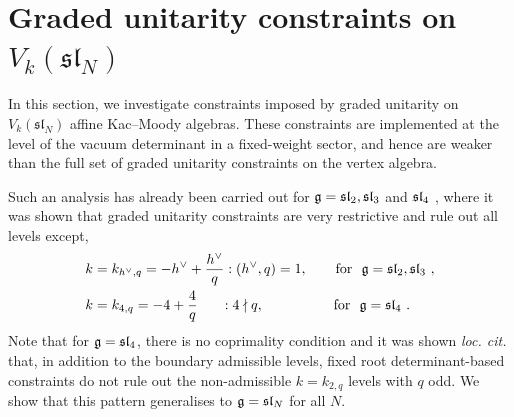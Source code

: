 \section{Graded unitarity constraints on $V_k(\mathfrak{sl}_N)$} \label{sec:typeAgrunit}
In this section, we investigate constraints imposed by graded unitarity on $V_k(\mathfrak{sl}_N)$ affine Kac--Moody algebras. These constraints are implemented at the level of the vacuum determinant in a fixed-weight sector, and hence are weaker than the full set of graded unitarity constraints on the vertex algebra. 

Such an analysis has already been carried out for $\mathfrak{g} = \mathfrak{sl}_2, \mathfrak{sl}_3$ and $\mathfrak{sl}_4$ \cite{ArabiArdehali:2025fad}, where it was shown that graded unitarity constraints are very restrictive and rule out all levels except,
\begin{equation}
\begin{split}
    &k = k_{h^\vee,q} = -h^\vee + \frac{h^\vee}{q}: (h^\vee,q) = 1, \qquad \mathrm{for} \ \ \mathfrak{g} = \mathfrak{sl}_2, \mathfrak{sl}_3~, \\
    &k = k_{4,q} = -4 + \frac{4}{q} \ \ \ \ \ :4 \nmid q, \qquad \qquad \ \ \ \mathrm{for} \ \ \mathfrak{g} = \mathfrak{sl}_4~.
\end{split}
\end{equation}
Note that for $\mathfrak{g} = \mathfrak{sl}_4$, there is no coprimality condition and it was shown \emph{loc. cit.} that, in addition to the boundary admissible levels, fixed root determinant-based constraints do not rule out the non-admissible $k = k_{2,q}$ levels with $q$ odd. We show that this pattern generalises to $\mathfrak{g} = \mathfrak{sl}_N$ for all $N$. 

